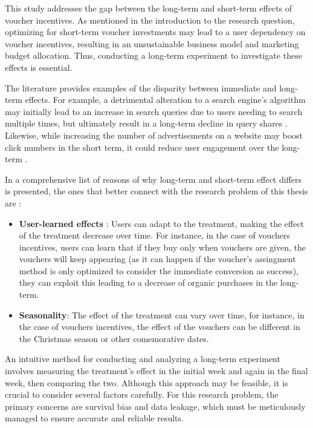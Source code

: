 This study addresses the gap between the long-term and short-term effects of voucher incentives. As mentioned in the introduction to the research question,
optimizing for short-term voucher investments may lead to a user dependency on voucher incentives, resulting in an unsustainable business model and marketing budget allocation.
Thus, conducting a long-term experiment to investigate these effects is essential.

The literature provides examples of the disparity between immediate and long-term effects. For example, a detrimental alteration to a search engine's algorithm
may initially lead to an increase in search queries due to users needing to search multiple times, but ultimately result in a long-term decline in query shares
\parencite{kohavi_trustworthy_2012}. Likewise, while increasing the number of advertisements on a website may boost click numbers in the short term, it could reduce
user engagement over the long-term  \parencite{hohnhold_focusing_2015}.

In \textcite{kohavi_trustworthy_2020} a comprehensive list of reasons of why long-term and short-term effect differs is presented, the ones that better connect with 
the research problem of this thesis are :

\begin{itemize}
  \item \textbf{User-learned effects} : Users can adapt to the treatment, making the effect of the treatment decrease over time. 
  For instance, in the case of vouchers incentives, users can learn that if they buy only when vouchers are given, the vouchers will keep
  appearing (as it can happen if the voucher's assingment method is only optimized to consider the immediate conversion as success),
  they can exploit this leading to a decrease of organic purchases in the long-term.
  \item \textbf{Seasonality}: The effect of the treatment can vary over time, for instance, in the case of vouchers incentives, 
  the effect of the vouchers can be different in the Christmas season or other comemorative dates.
\end{itemize}

An intuitive method for conducting and analyzing a long-term experiment involves measuring the treatment's effect in the initial week and again in the final 
week, then comparing the two. Although this approach may be feasible, it is crucial to consider several factors carefully. For this research problem, the primary 
concerns are survival bias and data leakage, which must be meticulously managed to ensure accurate and reliable results.

